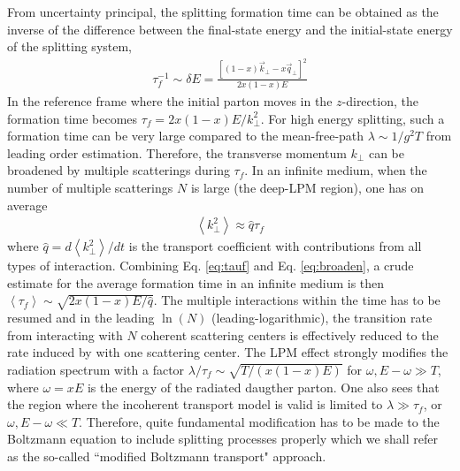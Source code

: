 \documentclass[aps, prc, reprint, amsmath, groupedaddress, nofootinbib]{revtex4-1}
\begin{document}
From uncertainty principal, the splitting formation time can be obtained as the inverse of the difference between the final-state energy and the initial-state energy of the splitting system,
\begin{eqnarray}
\tau_f^{-1} \sim \delta E = \frac{[(1-x)\vec{k}_\perp - x\vec{q}_\perp]^2}{2x(1-x)E} 
\label{eq:tauf}
\end{eqnarray}
In the reference frame where the initial parton moves in the $z$-direction, the formation time becomes $\tau_f = 2x(1-x)E/k_\perp^2$.
For high energy splitting, such a formation time can be very large compared to the mean-free-path $\lambda \sim 1/g^2T$ from leading order estimation.
Therefore, the transverse momentum $k_\perp$ can be broadened by multiple scatterings during $\tau_f$.
In an infinite medium, when the number of multiple scatterings $N$ is large (the deep-LPM region), one has on average
\begin{eqnarray}
\left\langle k_\perp^2 \right\rangle \approx \hat{q} \tau_f \label{eq:broaden}
\end{eqnarray}
where $\hat{q} = d \left\langle k_\perp^2 \right\rangle / dt$ is the transport coefficient with contributions from all types of interaction.
Combining Eq. \ref{eq:tauf} and Eq. \ref{eq:broaden}, a crude estimate for the average formation time in an infinite medium is then $\left\langle \tau_f \right\rangle \sim \sqrt{2x(1-x)E/\hat{q}}$.
The multiple interactions within the time has to be resumed and in the leading $\ln(N)$ (leading-logarithmic), the transition rate from interacting with $N$ coherent scattering centers is effectively reduced to the rate induced by with one scattering center. 
The LPM effect strongly modifies the radiation spectrum with a factor $\lambda/\tau_f \sim \sqrt{T/(x(1-x)E)}$ for $\omega, E-\omega \gg T$, where $\omega = xE$ is the energy of the radiated daugther parton.
One also sees that the region where the incoherent transport model is valid is limited to $\lambda \gg \tau_f$, or $\omega, E-\omega \ll T$.
Therefore, quite fundamental modification has to be made to the Boltzmann equation to include splitting processes properly which we shall refer as the so-called ``modified Boltzmann transport" approach.
\end{document}

